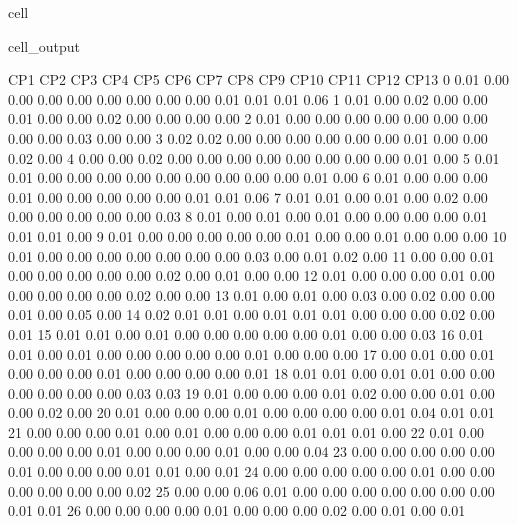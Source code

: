 \documentclass[letterpaper,10pt,english]{jupyterBook}
\begin{document}
\begin{sphinxuseclass}{cell}
\begin{sphinxVerbatimOutput}
\begin{sphinxuseclass}{cell_output}
\begin{sphinxVerbatim}[commandchars=\\\{\}]
            	CP1	CP2	CP3	CP4	CP5	CP6	CP7	CP8	CP9	CP10	CP11	CP12	CP13 
         0	0.01 	0.00 	0.00 	0.00 	0.00 	0.00 	0.00 	0.00 	0.00 	0.01 	0.01 	0.01 	0.06
         1	0.01 	0.00 	0.02 	0.00 	0.00 	0.01 	0.00 	0.00 	0.02 	0.00 	0.00 	0.00 	0.00
         2	0.01 	0.00 	0.00 	0.00 	0.00 	0.00 	0.00 	0.00 	0.00 	0.00 	0.03 	0.00 	0.00
         3	0.02 	0.02 	0.00 	0.00 	0.00 	0.00 	0.00 	0.00 	0.01 	0.00 	0.00 	0.02 	0.00
         4	0.00 	0.00 	0.02 	0.00 	0.00 	0.00 	0.00 	0.00 	0.00 	0.00 	0.00 	0.01 	0.00
         5	0.01 	0.01 	0.00 	0.00 	0.00 	0.00 	0.00 	0.00 	0.00 	0.00 	0.00 	0.01 	0.00
         6	0.01 	0.00 	0.00 	0.00 	0.01 	0.00 	0.00 	0.00 	0.00 	0.00 	0.01 	0.01 	0.06
         7	0.01 	0.01 	0.00 	0.01 	0.00 	0.02 	0.00 	0.00 	0.00 	0.00 	0.00 	0.00 	0.03
         8	0.01 	0.00 	0.01 	0.00 	0.01 	0.00 	0.00 	0.00 	0.00 	0.01 	0.01 	0.01 	0.00
         9	0.01 	0.00 	0.00 	0.00 	0.00 	0.00 	0.01 	0.00 	0.00 	0.01 	0.00 	0.00 	0.00
        10	0.01 	0.00 	0.00 	0.00 	0.00 	0.00 	0.00 	0.00 	0.03 	0.00 	0.01 	0.02 	0.00
        11	0.00 	0.00 	0.01 	0.00 	0.00 	0.00 	0.00 	0.00 	0.02 	0.00 	0.01 	0.00 	0.00
        12	0.01 	0.00 	0.00 	0.00 	0.01 	0.00 	0.00 	0.00 	0.00 	0.00 	0.02 	0.00 	0.00
        13	0.01 	0.00 	0.01 	0.00 	0.03 	0.00 	0.02 	0.00 	0.00 	0.01 	0.00 	0.05 	0.00
        14	0.02 	0.01 	0.01 	0.00 	0.01 	0.01 	0.01 	0.00 	0.00 	0.00 	0.02 	0.00 	0.01
        15	0.01 	0.01 	0.00 	0.01 	0.00 	0.00 	0.00 	0.00 	0.00 	0.01 	0.00 	0.00 	0.03
        16	0.01 	0.01 	0.00 	0.01 	0.00 	0.00 	0.00 	0.00 	0.00 	0.01 	0.00 	0.00 	0.00
        17	0.00 	0.01 	0.00 	0.01 	0.00 	0.00 	0.00 	0.01 	0.00 	0.00 	0.00 	0.00 	0.01
        18	0.01 	0.01 	0.00 	0.01 	0.01 	0.00 	0.00 	0.00 	0.00 	0.00 	0.00 	0.03 	0.03
        19	0.01 	0.00 	0.00 	0.00 	0.01 	0.02 	0.00 	0.00 	0.01 	0.00 	0.00 	0.02 	0.00
        20	0.01 	0.00 	0.00 	0.00 	0.01 	0.00 	0.00 	0.00 	0.00 	0.01 	0.04 	0.01 	0.01
        21	0.00 	0.00 	0.00 	0.01 	0.00 	0.01 	0.00 	0.00 	0.00 	0.01 	0.01 	0.01 	0.00
        22	0.01 	0.00 	0.00 	0.00 	0.00 	0.01 	0.00 	0.00 	0.00 	0.01 	0.00 	0.00 	0.04
        23	0.00 	0.00 	0.00 	0.00 	0.00 	0.01 	0.00 	0.00 	0.00 	0.01 	0.01 	0.00 	0.01
        24	0.00 	0.00 	0.00 	0.00 	0.00 	0.01 	0.00 	0.00 	0.00 	0.00 	0.00 	0.00 	0.02
        25	0.00 	0.00 	0.06 	0.01 	0.00 	0.00 	0.00 	0.00 	0.00 	0.00 	0.00 	0.01 	0.01
        26	0.00 	0.00 	0.00 	0.00 	0.01 	0.00 	0.00 	0.00 	0.02 	0.00 	0.01 	0.00 	0.01

\end{sphinxVerbatim}
\end{sphinxuseclass}
\end{sphinxVerbatimOutput}
\end{sphinxuseclass}
\end{document}
